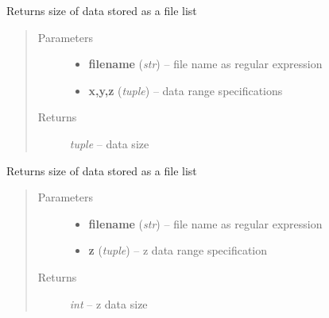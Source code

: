 \documentclass[letterpaper,10pt,english]{sphinxmanual}
\begin{document}
\begin{fulllineitems}
\label{api/ClearMap.IO:ClearMap.IO.FileList.dataSize}
Returns size of data stored as a file list
\begin{quote}\begin{description}
\item[{Parameters}] \leavevmode\begin{itemize}
\item {} 
\textbf{filename} (\emph{str}) --
file name as regular expression

\item {} 
\textbf{x,y,z} (\emph{tuple}) --
data range specifications

\end{itemize}

\item[{Returns}] \leavevmode
\emph{tuple} --
data size

\end{description}\end{quote}

\end{fulllineitems}


\begin{fulllineitems}
\label{api/ClearMap.IO:ClearMap.IO.FileList.dataZSize}
Returns size of data stored as a file list
\begin{quote}\begin{description}
\item[{Parameters}] \leavevmode\begin{itemize}
\item {} 
\textbf{filename} (\emph{str}) --
file name as regular expression

\item {} 
\textbf{z} (\emph{tuple}) --
z data range specification

\end{itemize}

\item[{Returns}] \leavevmode
\emph{int} --
z data size

\end{description}\end{quote}

\end{fulllineitems}
\end{document}

